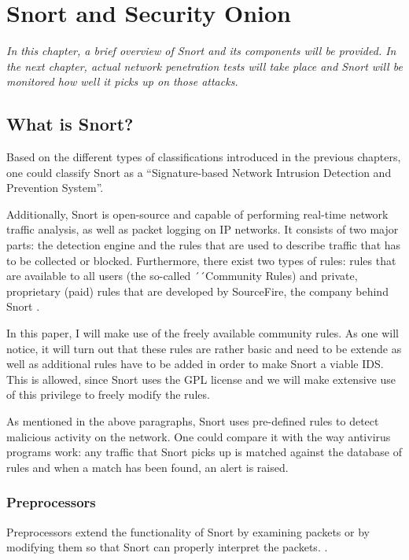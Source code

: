 \chapter{Snort and Security Onion}
\minitoc
\emph{In this chapter, a brief overview of Snort and its components will be provided. In the next chapter,  actual network penetration tests will take place and Snort will be monitored how well it picks up on those attacks.}

\section{What is Snort?}

Based on the different types of classifications introduced in the previous chapters, one could classify Snort as a ``Signature-based Network Intrusion Detection and Prevention System''.

Additionally, Snort is open-source and capable of performing real-time network traffic analysis, as well as packet logging on IP networks. It consists of two major parts: the detection engine and the rules that are used to describe traffic that has to be collected or blocked. Furthermore, there exist two types of rules: rules that are available to all users (the so-called ´´Community Rules) and private, proprietary (paid) rules that are developed by SourceFire, the company behind Snort \citep{SnortLicense}.

In this paper, I will make use of the freely available community rules. As one will notice, it will turn out that these rules are rather basic and need to be extende as well as additional rules have to be added in order to make Snort a viable IDS. This is allowed, since Snort uses the GPL license and we will make extensive use of this privilege to freely modify the rules.

As mentioned in the above paragraphs, Snort uses pre-defined rules to detect malicious activity on the network. One could compare it with the way antivirus programs work: any traffic that Snort picks up is matched against the database of rules and when a match has been found, an alert is raised.

\subsection{Preprocessors}

Preprocessors extend the functionality of Snort by examining packets or by modifying them so that Snort can properly interpret the packets. \citep{Preprocessor1}.

